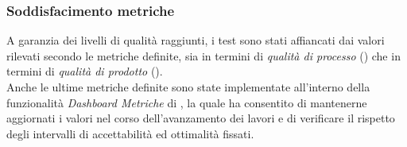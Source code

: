 \subsubsection{Soddisfacimento metriche}
A garanzia dei livelli di qualità raggiunti, i test sono stati affiancati dai valori rilevati secondo le metriche definite, sia in termini di \textit{qualità di processo} () che in termini di \textit{qualità di prodotto} ().\\
Anche le ultime metriche definite sono state implementate all'interno della funzionalità \textit{Dashboard Metriche} di \pragmadb, la quale ha consentito di mantenerne aggiornati i valori nel corso dell'avanzamento dei lavori e di verificare il rispetto degli intervalli di accettabilità ed ottimalità fissati.\\
